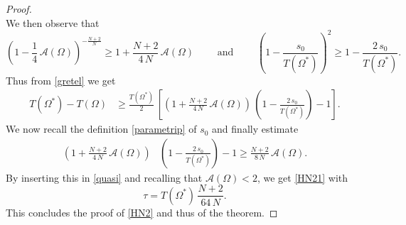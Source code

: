 \documentclass{amsart}
\theoremstyle{definition}
\numberwithin{equation}{section}
\begin{document}
\begin{proof}
\begin{equation}
\end{equation}
We then observe that
\[
\left(1-\displaystyle\frac{1}{4}\,\mathcal{A}(\Omega)\right)^{-\frac{N+2}{N}}\ge 1+\frac{N+2}{4\,N}\,\mathcal{A}(\Omega)\qquad \mbox{ and }\qquad 
\left(1-\frac{s_0}{T(\Omega^*)}\right)^{2}\ge 1-\frac{2\,s_0}{T(\Omega^*)}.
\]
Thus from \eqref{gretel} we get
\begin{equation}
\label{quasi}
\begin{split}
T(\Omega^*)-T(\Omega)&\ge \frac{T(\Omega^*)}{2}\,\left[\left(1+\frac{N+2}{4\,N}\,\mathcal{A}(\Omega)\right)\, \left(1-\frac{2\,s_0}{T(\Omega^*)}\right)-1\right].
\end{split}
\end{equation}
We now recall the definition \eqref{parametrip} of $s_0$ and finally estimate
\[
\begin{split}
\left(1+\frac{N+2}{4\,N}\,\mathcal{A}(\Omega)\right)& \left(1-\frac{2\,s_0}{T(\Omega^*)}\right)-1\ge \frac{N+2}{8\,N}\,\mathcal{A}(\Omega).
\end{split}
\]
By inserting this in \eqref{quasi} and recalling that $\mathcal{A}(\Omega)<2$, we get \eqref{HN21} with
\[
\tau=T(\Omega^*)\,\frac{N+2}{64\,N}.
\]
This concludes the proof of \eqref{HN2} and thus of the theorem.
\end{proof}
\end{document}
